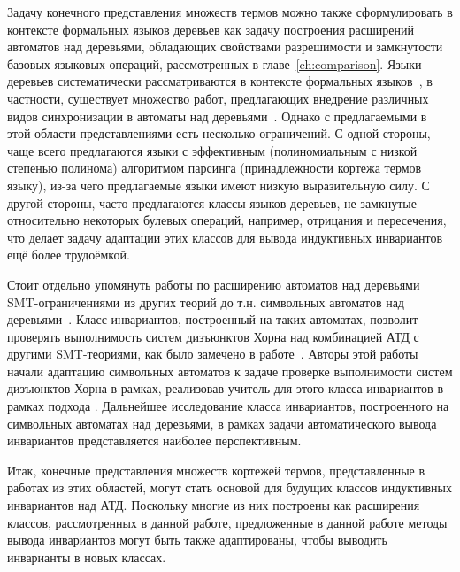 Задачу конечного представления множеств термов можно также сформулировать в контексте формальных языков деревьев как задачу построения расширений автоматов над деревьями, обладающих свойствами разрешимости и замкнутости базовых языковых операций, рассмотренных в главе~\ref{ch:comparison}. Языки деревьев систематически рассматриваются в контексте формальных языков~\cite{10.5555/267871}, в частности, существует множество работ, предлагающих внедрение различных видов синхронизации в автоматы над деревьями~\cite{chabin2007visibly, gouranton2001synchronized, limet2001weakly, chabin2006synchronized, jacquemard2009rigid, engelfriet2017multiple}. Однако с предлагаемыми в этой области представлениями есть несколько ограничений. С одной стороны, чаще всего предлагаются языки с эффективным (полиномиальным с низкой степенью полинома) алгоритмом парсинга (принадлежности кортежа термов языку), из-за чего предлагаемые языки имеют низкую выразительную силу. С другой стороны, часто предлагаются классы языков деревьев, не замкнутые относительно некоторых булевых операций, например, отрицания и пересечения, что делает задачу адаптации этих классов для вывода индуктивных инвариантов ещё более трудоёмкой.

Стоит отдельно упомянуть работы по расширению автоматов над деревьями SMT-ограничениями из других теорий до т.\:н. символьных автоматов над деревьями~\cite{VEANES2015418,10.1145/2933575.2933578}. Класс инвариантов, построенный на таких автоматах, позволит проверять выполнимость систем дизъюнктов Хорна над комбинацией АТД с другими SMT-теориями, как было замечено в работе~\cite{10.1007/978-3-031-13188-2_13}. Авторы этой работы начали адаптацию символьных автоматов к задаче проверке выполнимости систем дизъюнктов Хорна в рамках, реализовав учитель для этого класса инвариантов в рамках подхода \ice{}. Дальнейшее исследование класса инвариантов, построенного на символьных автоматах над деревьями, в рамках задачи автоматического вывода инвариантов представляется наиболее перспективным.

Итак, конечные представления множеств кортежей термов, представленные в работах из этих областей, могут стать основой для будущих классов индуктивных инвариантов над АТД. Поскольку многие из них построены как расширения классов, рассмотренных в данной работе, предложенные в данной работе методы вывода инвариантов могут быть также адаптированы, чтобы выводить инварианты в новых классах.

